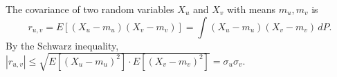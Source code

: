 The covariance of two random variables $X_u$ and $X_v$ with means $m_u, m_v$ is
$$r_{u,v} = E[(X_u - m_u)(X_v - m_v)] = \int (X_u - m_u)(X_v - m_v) \, dP.$$
By the Schwarz inequality, $|r_{u,v}| \leq \sqrt{E[(X_u - m_u)^2] \cdot E[(X_v - m_v)^2]} = \sigma_u \sigma_v$.
